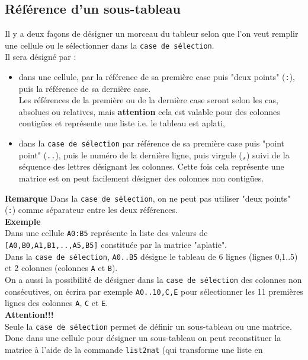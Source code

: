 \documentclass[a4paper,11pt]{book}
\begin{document}
\subsection{R\'ef\'erence d'un sous-tableau}
Il y a deux fa\c{c}ons de d\'esigner un morceau du tableur selon que l'on veut 
remplir une cellule ou le s\'electionner dans la {\tt case de s\'election}.\\
 Il sera d\'esign\'e par :
\begin{itemize}
\item dans une cellule, par la r\'ef\'erence de sa premi\`ere case puis 
"deux points" ({\tt :}), puis la r\'ef\'erence de sa derni\`ere case.\\
Les r\'ef\'erences de la premi\`ere ou de la derni\`ere case seront selon les 
cas, absolues ou relatives, mais {\bf attention} cela est valable pour des 
colonnes contig\"ues et repr\'esente une liste i.e. le tableau est aplati,
\item dans la {\tt case de s\'election} par
r\'ef\'erence de sa premi\`ere case puis "point point" ({\tt ..}), puis le
num\'ero de la derni\`ere ligne, puis virgule ({\tt ,}) suivi de la s\'equence 
des lettres d\'esignant les colonnes. Cette fois cela repr\'esente une matrice
est on peut facilement d\'esigner des colonnes non contig\"ues.
\end{itemize}
{\bf Remarque}
Dans la {\tt case de s\'election}, on ne peut pas utiliser "deux points" 
({\tt :}) comme s\'eparateur entre les deux r\'ef\'erences.\\
{\bf Exemple}\\
Dans une cellule  {\tt A0:B5} repr\'esente la liste des valeurs de
{\tt [A0,B0,A1,B1,..,A5,B5]} constitu\'ee par la matrice "aplatie".\\
Dans la {\tt case de s\'election}, {\tt A0..B5} d\'esigne le tableau de 6 
lignes (lignes 0,1..5) et 2 colonnes (colonnes {\tt A} et {\tt B}).\\
On a aussi la possibilit\'e de d\'esigner dans la 
{\tt case de s\'election} des colonnes non cons\'ecutives, on \'ecrira par 
exemple {\tt A0..10,C,E} pour s\'electionner 
les 11 premi\`eres lignes des colonnes {\tt A}, {\tt C} et {\tt E}.\\
{\bf Attention!!!} \\
Seule la {\tt case de s\'election} permet de d\'efinir un 
sous-tableau ou une matrice.\\  
Donc dans une cellule pour d\'esigner un sous-tableau on peut reconstituer la 
matrice \`a l'aide de la commande {\tt list2mat} (qui transforme une liste en 
\end{document}
